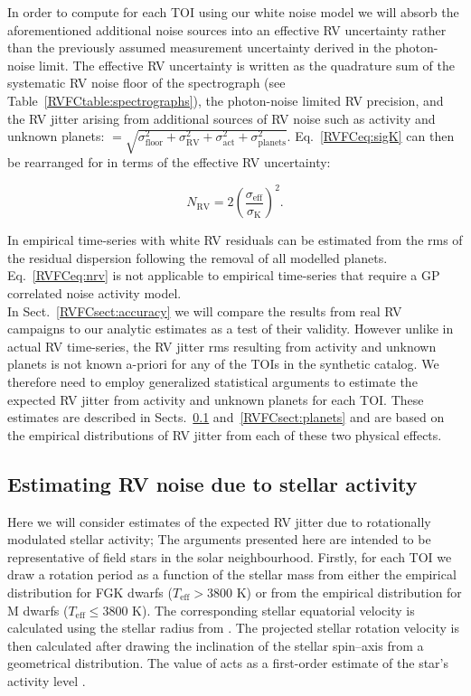 In order to compute \nrv{} for each TOI using our white noise model we will
absorb the aforementioned additional noise sources into an effective RV uncertainty \sigeff{} rather than the
previously assumed measurement uncertainty derived in the photon-noise limit. The effective RV uncertainty is
written as the quadrature sum of the systematic RV noise floor of the spectrograph \sigfloor{}
(see Table~\ref{RVFCtable:spectrographs}), the photon-noise limited RV precision, and the RV jitter arising from
additional sources of RV noise such as activity and unknown planets: \sigeff{}
$=\sqrt{\sigma_{\text{floor}}^2+\sigma_{\text{RV}}^2+\sigma_{\text{act}}^2 + \sigma_{\text{planets}}^2}$.
Eq.~\ref{RVFCeq:sigK} can then be rearranged for \nrv{} in terms of the effective RV uncertainty:

\begin{equation}
  N_{\text{RV}} = 2 \left( \frac{\sigma_{\text{eff}}}{\sigma_{\text{K}}} \right)^2.
  \label{RVFCeq:nrv}
\end{equation}

\noindent In empirical time-series with white RV residuals
\sigeff{} can be estimated from the rms of the residual dispersion following the removal of
all modelled planets. Eq.~\ref{RVFCeq:nrv} is not applicable to 
empirical time-series that require a GP correlated noise activity model. \\

In Sect.~\ref{RVFCsect:accuracy} we will compare the results from real RV campaigns to our 
analytic estimates as a test of their validity. 
However unlike in actual RV time-series, the RV jitter rms
resulting from activity and unknown planets is not known a-priori for any of the TOIs in the
 synthetic catalog. We therefore need to employ generalized statistical arguments
to estimate the expected RV jitter from activity and unknown planets for each TOI. These estimates are
described in Sects.~\ref{RVFCsect:act} and~\ref{RVFCsect:planets} and are based on the empirical distributions of
RV jitter from each of these two physical effects.

\subsection{Estimating RV noise due to stellar activity} \label{RVFCsect:act}
Here we will consider estimates of the expected RV jitter due to rotationally modulated stellar
activity;  The arguments presented here are intended to be
representative of field stars in the
solar neighbourhood. Firstly, for each TOI we draw a rotation period \prot{} as a function of the stellar
mass from either the \cite{pizzolato03} empirical distribution for FGK dwarfs ($T_{\text{eff}} > 3800$ K) or from
the \cite{newton16a} empirical distribution for M dwarfs ($T_{\text{eff}} \leq 3800$ K). The corresponding
stellar equatorial velocity is calculated using the stellar radius from . The projected
stellar rotation velocity \vsini{} is then calculated after drawing the inclination of the stellar spin--axis
from a geometrical distribution. The value of \vsini{} acts as a first-order estimate of the star's activity
level \citep[e.g.][]{west15, moutou17}. \\

